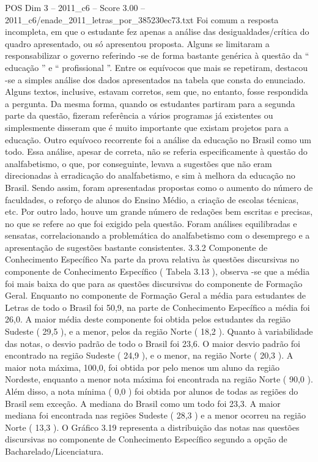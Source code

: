 \begin{textsample}{POS Dim 3 – 2011\_c6 – Score 3.00 – 2011\_c6/enade\_2011\_letras\_por\_385230ec73.txt}
Foi comum a resposta incompleta, em que o estudante fez apenas a análise das desigualdades/crítica do quadro apresentado, ou só apresentou proposta.
Alguns se limitaram a responsabilizar o governo referindo -se de forma bastante genérica à questão da “ educação ” e “ profissional ”.
Entre os equívocos que mais se repetiram, destacou -se a simples análise dos dados apresentados na tabela que consta do enunciado.
Alguns textos, inclusive, estavam corretos, sem que, no entanto, fosse respondida a pergunta.
Da mesma forma, quando os estudantes partiram para a segunda parte da questão, fizeram referência a vários programas já existentes ou simplesmente disseram que é muito importante que existam projetos para a educação.
Outro equívoco recorrente foi a análise da educação no Brasil como um todo.
Essa análise, apesar de correta, não se referia especificamente à questão do analfabetismo, o que, por conseguinte, levava a sugestões que não eram direcionadas à erradicação do analfabetismo, e sim à melhora da educação no Brasil.
Sendo assim, foram apresentadas propostas como o aumento do número de faculdades, o reforço de alunos do Ensino Médio, a criação de escolas técnicas, etc.
Por outro lado, houve um grande número de redações bem escritas e precisas, no que se refere ao que foi exigido pela questão.
Foram análises equilibradas e sensatas, correlacionando a problemática do analfabetismo com o desemprego e a apresentação de sugestões bastante consistentes. 3.3.2 Componente de Conhecimento Específico Na parte da prova relativa às questões discursivas no componente de Conhecimento Específico ( Tabela 3.13 ), observa -se que a média foi mais baixa do que para as questões discursivas do componente de Formação Geral.
Enquanto no componente de Formação Geral a média para estudantes de Letras de todo o Brasil foi 50,9, na parte de Conhecimento Específico a média foi 26,0.
A maior média deste componente foi obtida pelos estudantes da região Sudeste ( 29,5 ), e a menor, pelos da região Norte ( 18,2 ).
Quanto à variabilidade das notas, o desvio padrão de todo o Brasil foi 23,6.
O maior desvio padrão foi encontrado na região Sudeste ( 24,9 ), e o menor, na região Norte ( 20,3 ).
A maior nota máxima, 100,0, foi obtida por pelo menos um aluno da região Nordeste, enquanto a menor nota máxima foi encontrada na região Norte ( 90,0 ).
Além disso, a nota mínima ( 0,0 ) foi obtida por alunos de todas as regiões do Brasil sem exceção.
A mediana do Brasil como um todo foi 23,3.
A maior mediana foi encontrada nas regiões Sudeste ( 28,3 ) e a menor ocorreu na região Norte ( 13,3 ).
O Gráfico 3.19 representa a distribuição das notas nas questões discursivas no componente de Conhecimento Específico segundo a opção de Bacharelado/Licenciatura.

\end{textsample}

